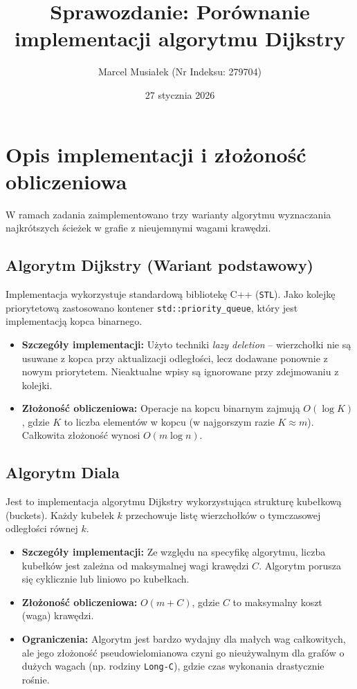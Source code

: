 \documentclass[a4paper,12pt]{article}
\title{Sprawozdanie: Porównanie implementacji algorytmu Dijkstry}
\author{Marcel Musiałek (Nr Indeksu: 279704)}
\date{27 stycznia 2026}
\begin{document}
\maketitle

\section{Opis implementacji i złożoność obliczeniowa}

W ramach zadania zaimplementowano trzy warianty algorytmu wyznaczania najkrótszych ścieżek w grafie z nieujemnymi wagami krawędzi.

\subsection{Algorytm Dijkstry (Wariant podstawowy)}
Implementacja wykorzystuje standardową bibliotekę C++ (\texttt{STL}). Jako kolejkę priorytetową zastosowano kontener \texttt{std::priority\_queue}, który jest implementacją kopca binarnego.
\begin{itemize}
    \item \textbf{Szczegóły implementacji:} Użyto techniki \textit{lazy deletion} – wierzchołki nie są usuwane z kopca przy aktualizacji odległości, lecz dodawane ponownie z nowym priorytetem. Nieaktualne wpisy są ignorowane przy zdejmowaniu z kolejki.
    \item \textbf{Złożoność obliczeniowa:} Operacje na kopcu binarnym zajmują $O(\log K)$, gdzie $K$ to liczba elementów w kopcu (w najgorszym razie $K \approx m$). Całkowita złożoność wynosi $O(m \log n)$.
\end{itemize}

\subsection{Algorytm Diala}
Jest to implementacja algorytmu Dijkstry wykorzystująca strukturę kubełkową (buckets). Każdy kubełek $k$ przechowuje listę wierzchołków o tymczasowej odległości równej $k$.
\begin{itemize}
    \item \textbf{Szczegóły implementacji:} Ze względu na specyfikę algorytmu, liczba kubełków jest zależna od maksymalnej wagi krawędzi $C$. Algorytm porusza się cyklicznie lub liniowo po kubełkach.
    \item \textbf{Złożoność obliczeniowa:} $O(m + C)$, gdzie $C$ to maksymalny koszt (waga) krawędzi.
    \item \textbf{Ograniczenia:} Algorytm jest bardzo wydajny dla małych wag całkowitych, ale jego złożoność pseudowielomianowa czyni go nieużywalnym dla grafów o dużych wagach (np. rodziny \texttt{Long-C}), gdzie czas wykonania drastycznie rośnie.
\end{itemize}
\end{document}
